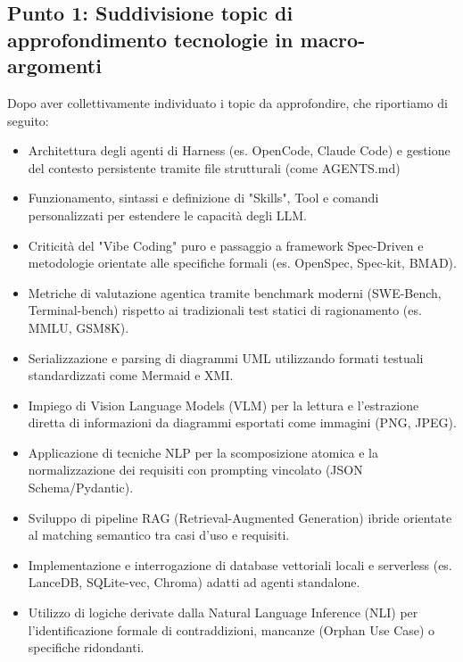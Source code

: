 \documentclass[a4paper, 11pt]{article}
\begin{document}
\subsection{Punto 1: Suddivisione topic di approfondimento tecnologie in macro-argomenti} \label{PuntoUno}
Dopo aver collettivamente individuato i topic da approfondire, che riportiamo di seguito:
\begin{itemize}
    \item Architettura degli agenti di Harness (es. OpenCode, Claude Code) e gestione del contesto persistente tramite file strutturali (come AGENTS.md)\vspace{-0.2cm}
    \item Funzionamento, sintassi e definizione di "Skills", Tool e comandi personalizzati per estendere le capacità degli LLM.\vspace{-0.2cm}
    \item Criticità del "Vibe Coding" puro e passaggio a framework Spec-Driven e metodologie orientate alle specifiche formali (es. OpenSpec, Spec-kit, BMAD).\vspace{-0.2cm}
    \item Metriche di valutazione agentica tramite benchmark moderni (SWE-Bench, Terminal-bench) rispetto ai tradizionali test statici di ragionamento (es. MMLU, GSM8K).\vspace{-0.2cm}
    \item Serializzazione e parsing di diagrammi UML utilizzando formati testuali standardizzati come Mermaid e XMI.\vspace{-0.2cm}
    \item Impiego di Vision Language Models (VLM) per la lettura e l'estrazione diretta di informazioni da diagrammi esportati come immagini (PNG, JPEG).\vspace{-0.2cm}
    \item Applicazione di tecniche NLP per la scomposizione atomica e la normalizzazione dei requisiti con prompting vincolato (JSON Schema/Pydantic).\vspace{-0.2cm}
    \item Sviluppo di pipeline RAG (Retrieval-Augmented Generation) ibride orientate al matching semantico tra casi d'uso e requisiti.\vspace{-0.2cm}
    \item Implementazione e interrogazione di database vettoriali locali e serverless (es. LanceDB, SQLite-vec, Chroma) adatti ad agenti standalone.\vspace{-0.2cm}
    \item Utilizzo di logiche derivate dalla Natural Language Inference (NLI) per l'identificazione formale di contraddizioni, mancanze (Orphan Use Case) o specifiche ridondanti.\vspace{-0.2cm}

\end{itemize}
\end{document}
